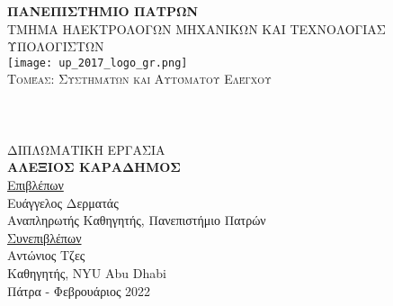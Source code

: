 \pagestyle{empty}

\begin{center}
\textsc{\textbf{\large ΠΑΝΕΠΙΣΤΗΜΙΟ ΠΑΤΡΩΝ}\\
\large ΤΜΗΜΑ ΗΛΕΚΤΡΟΛΟΓΩΝ ΜΗΧΑΝΙΚΩΝ ΚΑΙ ΤΕΧΝΟΛΟΓΙΑΣ ΥΠΟΛΟΓΙΣΤΩΝ}\\

\texttt{[image: up\_2017\_logo\_gr.png]}\\  

\textsc{Τομέας: \large Συστημάτων και Αυτόματου Ελέγχου}\\[1cm]

\HRule \\[0.4cm]
{\huge \bfseries \thesistitlegr }\\[0.4cm] %
\HRule \\[1.5cm]

\textsc{\Large ΔΙΠΛΩΜΑΤΙΚΗ ΕΡΓΑΣΙΑ}\\[0.5cm]
\textsc{\textbf{\LARGE{ΑΛΕΞΙΟΣ ΚΑΡΑΔΗΜΟΣ}}}\\ [0.5cm]

\underline{\large Επιβλέπων}\\[0.5cm]
\large Ευάγγελος Δερματάς\\ Αναπληρωτής Καθηγητής, Πανεπιστήμιο Πατρών \\[1cm]
\underline{\large Συνεπιβλέπων}\\[0.5cm]
\large Αντώνιος Τζες\\ Καθηγητής, NYU Abu Dhabi \\[1cm]
\vfill
\large{Πάτρα - Φεβρουάριος 2022}
\end{center}
